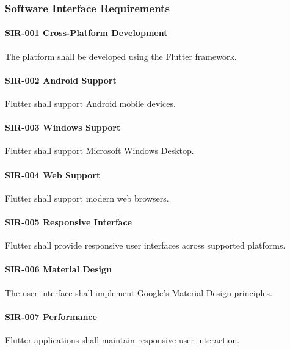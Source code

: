 \subsubsection*{Software Interface Requirements}

\paragraph{SIR-001 Cross-Platform Development}

The platform shall be developed using the Flutter framework.

\paragraph{SIR-002 Android Support}

Flutter shall support Android mobile devices.

\paragraph{SIR-003 Windows Support}

Flutter shall support Microsoft Windows Desktop.

\paragraph{SIR-004 Web Support}

Flutter shall support modern web browsers.

\paragraph{SIR-005 Responsive Interface}

Flutter shall provide responsive user interfaces across supported
platforms.

\paragraph{SIR-006 Material Design}

The user interface shall implement Google's Material Design principles.

\paragraph{SIR-007 Performance}

Flutter applications shall maintain responsive user interaction.

